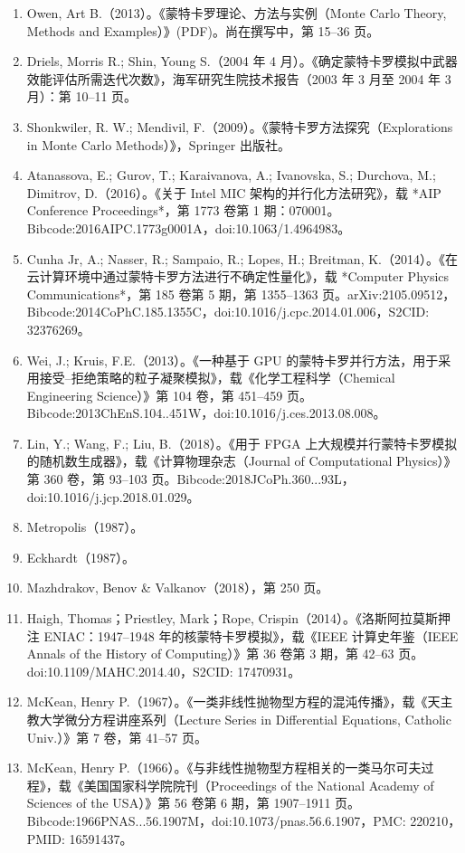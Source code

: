 \begin{enumerate}
\item Owen, Art B.（2013）。《蒙特卡罗理论、方法与实例（Monte Carlo Theory, Methods and Examples）》(PDF)。尚在撰写中，第 15–36 页。
\item Driels, Morris R.; Shin, Young S.（2004 年 4 月）。《确定蒙特卡罗模拟中武器效能评估所需迭代次数》，海军研究生院技术报告（2003 年 3 月至 2004 年 3 月）：第 10–11 页。
\item Shonkwiler, R. W.; Mendivil, F.（2009）。《蒙特卡罗方法探究（Explorations in Monte Carlo Methods）》，Springer 出版社。
\item Atanassova, E.; Gurov, T.; Karaivanova, A.; Ivanovska, S.; Durchova, M.; Dimitrov, D.（2016）。《关于 Intel MIC 架构的并行化方法研究》，载 *AIP Conference Proceedings*，第 1773 卷第 1 期：070001。Bibcode:2016AIPC.1773g0001A，doi:10.1063/1.4964983。
\item Cunha Jr, A.; Nasser, R.; Sampaio, R.; Lopes, H.; Breitman, K.（2014）。《在云计算环境中通过蒙特卡罗方法进行不确定性量化》，载 *Computer Physics Communications*，第 185 卷第 5 期，第 1355–1363 页。arXiv:2105.09512，Bibcode:2014CoPhC.185.1355C，doi:10.1016/j.cpc.2014.01.006，S2CID: 32376269。
\item Wei, J.; Kruis, F.E.（2013）。《一种基于 GPU 的蒙特卡罗并行方法，用于采用接受–拒绝策略的粒子凝聚模拟》，载《化学工程科学（Chemical Engineering Science）》第 104 卷，第 451–459 页。Bibcode:2013ChEnS.104..451W，doi:10.1016/j.ces.2013.08.008。
\item Lin, Y.; Wang, F.; Liu, B.（2018）。《用于 FPGA 上大规模并行蒙特卡罗模拟的随机数生成器》，载《计算物理杂志（Journal of Computational Physics）》第 360 卷，第 93–103 页。Bibcode:2018JCoPh.360...93L，doi:10.1016/j.jcp.2018.01.029。
\item Metropolis（1987）。
\item Eckhardt（1987）。
\item Mazhdrakov, Benov & Valkanov（2018），第 250 页。
\item Haigh, Thomas；Priestley, Mark；Rope, Crispin（2014）。《洛斯阿拉莫斯押注 ENIAC：1947–1948 年的核蒙特卡罗模拟》，载《IEEE 计算史年鉴（IEEE Annals of the History of Computing）》第 36 卷第 3 期，第 42–63 页。doi:10.1109/MAHC.2014.40，S2CID: 17470931。
\item McKean, Henry P.（1967）。《一类非线性抛物型方程的混沌传播》，载《天主教大学微分方程讲座系列（Lecture Series in Differential Equations, Catholic Univ.）》第 7 卷，第 41–57 页。
\item McKean, Henry P.（1966）。《与非线性抛物型方程相关的一类马尔可夫过程》，载《美国国家科学院院刊（Proceedings of the National Academy of Sciences of the USA）》第 56 卷第 6 期，第 1907–1911 页。Bibcode:1966PNAS...56.1907M，doi:10.1073/pnas.56.6.1907，PMC: 220210，PMID: 16591437。

\end{enumerate}
